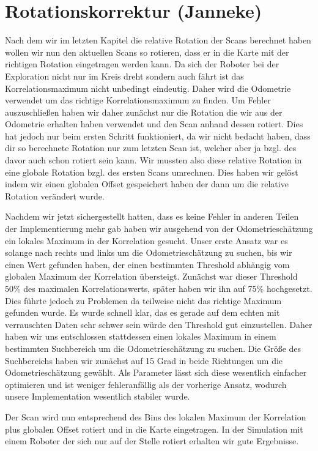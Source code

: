 \section{Rotationskorrektur (Janneke)}

Nach dem wir im letzten Kapitel die relative Rotation der Scans berechnet haben wollen wir nun den aktuellen Scans so rotieren, dass er in die Karte mit der richtigen Rotation eingetragen werden kann. Da sich der Roboter bei der Exploration nicht nur im Kreis dreht sondern auch fährt ist das Korrelationsmaximum nicht unbedingt eindeutig. Daher wird die Odometrie verwendet um das richtige Korrelationsmaximum zu finden. Um Fehler auszuschließen haben wir daher zunächst nur die Rotation die wir aus der Odometrie erhalten haben verwendet und den Scan anhand dessen rotiert. Dies hat jedoch nur beim ersten Schritt funktioniert, da wir nicht bedacht haben, dass dir so berechnete Rotation nur zum letzten Scan ist, welcher aber ja bzgl. des davor auch schon rotiert sein kann. Wir mussten also diese relative Rotation in eine globale Rotation bzgl. des ersten Scans umrechnen. Dies haben wir gelöst indem wir einen globalen Offset gespeichert haben der dann um die relative Rotation verändert wurde.

Nachdem wir jetzt sichergestellt hatten, dass es keine Fehler in anderen Teilen der Implementierung mehr gab haben wir ausgehend von der Odometrieschätzung ein lokales Maximum in der Korrelation gesucht. Unser erste Ansatz war es solange nach rechts und links um die Odometrieschätzung zu suchen, bis wir einen Wert gefunden haben, der einen bestimmten Threshold abhängig vom globalen Maximum der Korrelation übersteigt. Zunächst war dieser Threshold 50\% des maximalen Korrelationswerts, später haben wir ihn auf 75\% hochgesetzt. Dies führte jedoch zu Problemen da teilweise nicht das richtige Maximum gefunden wurde. Es wurde schnell klar, das es gerade auf dem echten mit verrauschten Daten sehr schwer sein würde den Threshold gut einzustellen. Daher haben wir uns entschlossen stattdessen einen lokales Maximum in einem bestimmten Suchbereich um die Odometrieschätzung zu suchen. Die Größe des Suchbereichs haben wir zunächst auf 15 Grad in beide Richtungen um die Odometrieschätzung gewählt. Als Parameter lässt sich diese wesentlich einfacher optimieren und ist weniger fehleranfällig als der vorherige Ansatz, wodurch unsere Implementation wesentlich stabiler wurde.

Der Scan wird nun entsprechend des Bins des lokalen Maximum der Korrelation plus globalen Offset rotiert und in die Karte eingetragen. In der Simulation mit einem Roboter der sich nur auf der Stelle rotiert erhalten wir gute Ergebnisse. 


